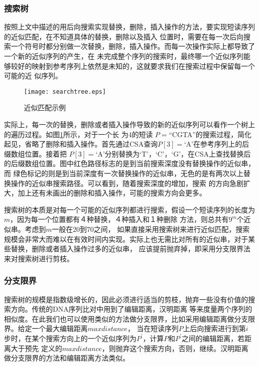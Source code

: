 \subsubsection{搜索树}

按照上文中描述的用后向搜索实现替换，删除，插入操作的方法，要实现短读序列的近似匹配，在不知道具体的替换，删除以及插入
位置时，需要在每一次后向搜索一个符号时都分别做一次替换，删除，插入操作。而每一次操作实际上都导致了一个新的近似序列的产生，在
未完成整个序列的搜索时，最终哪一个近似序列能够较好的映射到参考序列上依然是未知的，这就要求我们在搜索过程中保留每一个可能的近
似序列。

\begin{figure}[htb]
    \centering
    \texttt{[image: searchtree.eps]}
    \caption{近似匹配示例} \label{fig:searchtree}
\end{figure}

实际上，每一次的替换，删除或者插入操作导致的新的近似序列可以看作一个树上的遍历过程。如图\ref{fig:searchtree}所示，对于一个长
为4的短读 $P=$``CGTA''的搜索过程，简化起见，省略了删除和插入操作。首先通过CSA查询$P[3]=$`A'在参考序列上的后缀数组位置。接着把
$P[3]=$`A'分别替换为`T'，`C'，`G'，在CSA上查找替换后的后缀数组位置。图中红色路径标志的是到当前搜索深度没有替换操作的近似串，而
绿色标记的则是到当前深度有一次替换操作的近似串，无色的是有两次以上替换操作的近似串搜索路径。可以看到，随着搜索深度的增加，搜索
的方向急剧扩大，加上还有未画出的删除和插入操作，可能的搜索方向会更多。

搜索树的本质是对每一个可能的近似序列都进行搜索，假设一个短读序列的长度为$m$，因为每一个位置都有４种替换，４种插入和１种删除
方法，则总共有$9^m$个近似串。考虑到$m$一般在20到70之间，
如果直接采用搜索树来进行近似匹配，搜索规模会非常大而难以在有效时间内实现。实际上也无需比对所有的近似串，对于某些替换，删除或者插入操作过多的近似串，
应该提前抛弃掉，即采用分支限界法来对搜索树进行剪枝。

\subsubsection{分支限界}

搜索树的规模是指数级增长的，因此必须进行适当的剪枝，抛弃一些没有价值的搜索方向。传统的DNA序列比对中用到了编辑距离，汉明距离
等来度量两个序列的相似度。在此我们也可以使用类似的方法做分支限界，比如采用编辑距离做分支限界。给定一个最大编辑距离$maxdistance$，
当在短读序列$P$上后向搜索进行到第$i$步时，在某个搜索方向上的一个近似序列为$P^{'}$，计算$P$和$P^{'}$之间的编辑距离，若距离大于预先
定义的$maxdistance$，则抛弃这个搜索方向，否则，继续。汉明距离做分支限界的方法和编辑距离方法类似。

